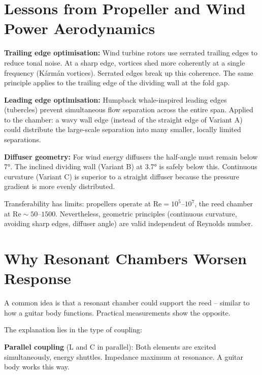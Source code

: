 \documentclass[11pt,a4paper]{article}
\begin{document}
\section{Lessons from Propeller and Wind Power Aerodynamics}

\textbf{Trailing edge optimisation:} Wind turbine rotors use serrated trailing edges to reduce tonal noise. At a sharp edge, vortices shed more coherently at a single frequency (Kármán vortices). Serrated edges break up this coherence. The same principle applies to the trailing edge of the dividing wall at the fold gap.

\textbf{Leading edge optimisation:} Humpback whale-inspired leading edges (tubercles) prevent simultaneous flow separation across the entire span. Applied to the chamber: a wavy wall edge (instead of the straight edge of Variant A) could distribute the large-scale separation into many smaller, locally limited separations.

\textbf{Diffuser geometry:} For wind energy diffusers the half-angle must remain below 7°. The inclined dividing wall (Variant B) at 3.7° is safely below this. Continuous curvature (Variant C) is superior to a straight diffuser because the pressure gradient is more evenly distributed.

\begin{keybox}
Transferability has limits: propellers operate at $\text{Re} = 10^5$--$10^7$, the reed chamber at $\text{Re} \sim 50$--$1500$. Nevertheless, geometric principles (continuous curvature, avoiding sharp edges, diffuser angle) are valid independent of Reynolds number.
\end{keybox}

\section{Why Resonant Chambers Worsen Response}

A common idea is that a resonant chamber could support the reed -- similar to how a guitar body functions. Practical measurements show the opposite.

The explanation lies in the type of coupling:

\textbf{Parallel coupling} (L and C in parallel): Both elements are excited simultaneously, energy shuttles. Impedance maximum at resonance. A guitar body works this way.
\end{document}
